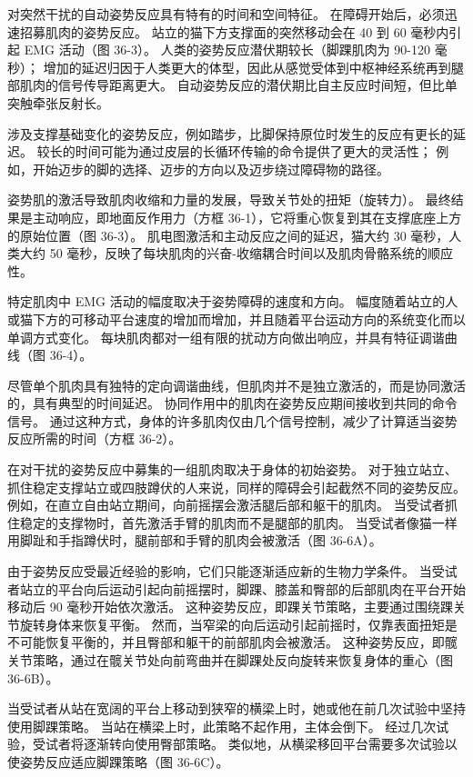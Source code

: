 对突然干扰的自动姿势反应具有特有的时间和空间特征。 在障碍开始后，必须迅速招募肌肉的姿势反应。 站立的猫下方支撑面的突然移动会在 40 到 60 毫秒内引起 EMG 活动（图 36-3）。 人类的姿势反应潜伏期较长（脚踝肌肉为 90-120 毫秒）； 增加的延迟归因于人类更大的体型，因此从感觉受体到中枢神经系统再到腿部肌肉的信号传导距离更大。 自动姿势反应的潜伏期比自主反应时间短，但比单突触牵张反射长。

涉及支撑基础变化的姿势反应，例如踏步，比脚保持原位时发生的反应有更长的延迟。 较长的时间可能为通过皮层的长循环传输的命令提供了更大的灵活性； 例如，开始迈步的脚的选择、迈步的方向以及迈步绕过障碍物的路径。

姿势肌的激活导致肌肉收缩和力量的发展，导致关节处的扭矩（旋转力）。 最终结果是主动响应，即地面反作用力（方框 36-1），它将重心恢复到其在支撑底座上方的原始位置（图 36-3）。 肌电图激活和主动反应之间的延迟，猫大约 30 毫秒，人类大约 50 毫秒，反映了每块肌肉的兴奋-收缩耦合时间以及肌肉骨骼系统的顺应性。

特定肌肉中 EMG 活动的幅度取决于姿势障碍的速度和方向。 幅度随着站立的人或猫下方的可移动平台速度的增加而增加，并且随着平台运动方向的系统变化而以单调方式变化。 每块肌肉都对一组有限的扰动方向做出响应，并具有特征调谐曲线（图 36-4）。

尽管单个肌肉具有独特的定向调谐曲线，但肌肉并不是独立激活的，而是协同激活的，具有典型的时间延迟。 协同作用中的肌肉在姿势反应期间接收到共同的命令信号。 通过这种方式，身体的许多肌肉仅由几个信号控制，减少了计算适当姿势反应所需的时间（方框 36-2）。

在对干扰的姿势反应中募集的一组肌肉取决于身体的初始姿势。 对于独立站立、抓住稳定支撑站立或四肢蹲伏的人来说，同样的障碍会引起截然不同的姿势反应。 例如，在直立自由站立期间，向前摇摆会激活腿后部和躯干的肌肉。 当受试者抓住稳定的支撑物时，首先激活手臂的肌肉而不是腿部的肌肉。 当受试者像猫一样用脚趾和手指蹲伏时，腿前部和手臂的肌肉会被激活（图 36-6A）。

由于姿势反应受最近经验的影响，它们只能逐渐适应新的生物力学条件。 当受试者站立的平台向后运动引起向前摇摆时，脚踝、膝盖和臀部的后部肌肉在平台开始移动后 90 毫秒开始依次激活。 这种姿势反应，即踝关节策略，主要通过围绕踝关节旋转身体来恢复平衡。 然而，当窄梁的向后运动引起前摇时，仅靠表面扭矩是不可能恢复平衡的，并且臀部和躯干的前部肌肉会被激活。 这种姿势反应，即髋关节策略，通过在髋关节处向前弯曲并在脚踝处反向旋转来恢复身体的重心（图 36-6B）。

当受试者从站在宽阔的平台上移动到狭窄的横梁上时，她或他在前几次试验中坚持使用脚踝策略。 当站在横梁上时，此策略不起作用，主体会倒下。 经过几次试验，受试者将逐渐转向使用臀部策略。 类似地，从横梁移回平台需要多次试验以使姿势反应适应脚踝策略（图 36-6C）。

